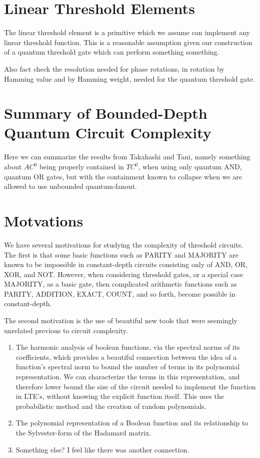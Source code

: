 \documentclass{article}
\begin{document}
\section{Linear Threshold Elements}

The linear threshold element is a primitive which we assume can implement
any linear threshold function. This is a reasonable assumption given our
construction of a quantum threshold gate which can perform something
something.

Also fact check the resolution needed for phase rotations, in rotation
by Hamming value and by Hamming weight, needed for the quantum threshold 
gate.

\section{Summary of Bounded-Depth Quantum Circuit Complexity}

Here we can summarize the results from Takahashi and Tani, namely
something about $AC^0$ being properly contained in $TC^0$, when using
only quantum AND, quantum OR gates, but with the containment known to
collapse when we are allowed to use unbounded quantum-fanout.

\section{Motvations}

We have several motivations for studying the complexity of threshold
circuits. The first is that some basic functions such as PARITY and MAJORITY
are known to be impossible in constant-depth circuits consisting only of
AND, OR, XOR, and NOT. However, when considering threshold gates, or
a special case MAJORITY, as a basic gate, then complicated arithmetic
functions such as PARITY, ADDITION, EXACT, COUNT, and so forth, become
possible in constant-depth.

The second motivation is the use of beautiful new tools that were
seemingly unrelated previous to circuit complexity.

\begin{enumerate}

\item
The harmonic analysis of boolean 
functions, via the spectral norms of its coefficients,
which provides a beautiful connection between the idea of
a function's spectral norm to bound the number of terms in its
polynomial representation. We can characterize the terms in this
representation, and therefore lower bound the size of the circuit
needed to implement the function in LTE's, without knowing the
explicit function itself.
This uses the probabilistic method and the creation of random polynomials.
\item The polynomial representation of a Boolean function and its
relationship to the Sylvester-form of the Hadamard matrix.
\item Something else? I feel like there was another connection.

\end{enumerate}
\end{document}
